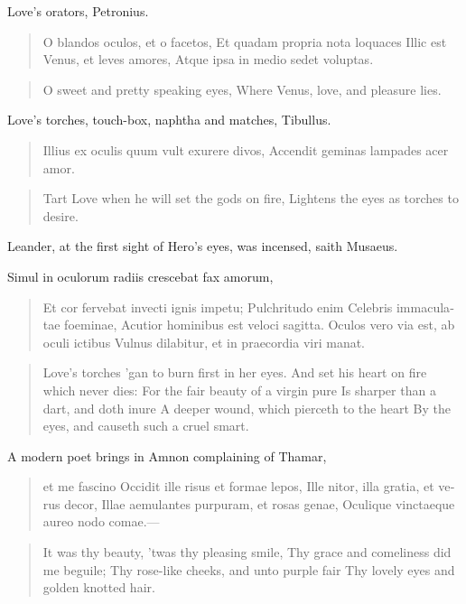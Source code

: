 Love's orators, Petronius.

\begin{latin}
\begin{verse}%
O blandos oculos, et o facetos,
Et quadam propria nota loquaces
Illic est Venus, et leves amores,
Atque ipsa in medio sedet voluptas.
\end{verse}%
\end{latin}
\translationrule%
\begin{verse}%
O sweet and pretty speaking eyes,
Where Venus, love, and pleasure lies.
\end{verse}%

Love's torches, touch-box, naphtha and matches, Tibullus.

\begin{latin}
\begin{verse}%
Illius ex oculis quum vult exurere divos,
Accendit geminas lampades acer amor.
\end{verse}%
\end{latin}
\translationrule%
\begin{verse}%
Tart Love when he will set the gods on fire,
Lightens the eyes as torches to desire.
\end{verse}%

Leander, at the first sight of Hero's eyes, was incensed, saith
Musaeus.

Simul in oculorum radiis crescebat fax amorum,

\begin{latin}
\begin{verse}%
Et cor fervebat invecti ignis impetu;
Pulchritudo enim Celebris immaculatae foeminae,
Acutior hominibus est veloci sagitta.
Oculos vero via est, ab oculi ictibus
Vulnus dilabitur, et in praecordia viri manat.
\end{verse}%
\end{latin}
\translationrule%
\begin{verse}%
Love's torches 'gan to burn first in her eyes.
And set his heart on fire which never dies:
For the fair beauty of a virgin pure
Is sharper than a dart, and doth inure
A deeper wound, which pierceth to the heart
By the eyes, and causeth such a cruel smart.
\end{verse}%

A modern poet brings in Amnon complaining of Thamar,

\begin{latin}
\begin{verse}%
et me fascino
Occidit ille risus et formae lepos,
Ille nitor, illa gratia, et verus decor,
Illae aemulantes purpuram, et rosas genae,
Oculique vinctaeque aureo nodo comae.---
\end{verse}%
\end{latin}
\translationrule%
\begin{verse}%
It was thy beauty, 'twas thy pleasing smile,
Thy grace and comeliness did me beguile;
Thy rose-like cheeks, and unto purple fair
Thy lovely eyes and golden knotted hair.
\end{verse}%

